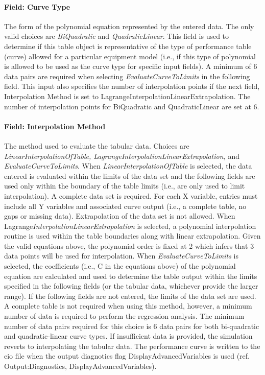 \paragraph{Field: Curve Type}\label{field-curve-type-1}

The form of the polynomial equation represented by the entered data. The only valid choices are \emph{BiQuadratic} and \emph{QuadraticLinear}. This field is used to determine if this table object is representative of the type of performance table (curve) allowed for a particular equipment model (i.e., if this type of polynomial is allowed to be used as the curve type for specific input fields). A minimum of 6 data pairs are required when selecting \emph{EvaluateCurveToLimits} in the following field. This input also specifies the number of interpolation points if the next field, Interpolation Method is set to LagrangeInterpolationLinearExtrapolation. The number of interpolation points for BiQuadratic and QuadraticLinear are set at 6.

\paragraph{Field: Interpolation Method}\label{field-interpolation-method-1}

The method used to evaluate the tabular data. Choices are \emph{LinearInterpolationOfTable, LagrangeInterpolationLinearExtrapolation,} and \emph{EvaluateCurveToLimits}. When \emph{LinearInterpolationOfTable} is selected, the data entered is evaluated within the limits of the data set and the following fields are used only within the boundary of the table limits (i.e., are only used to limit interpolation). A complete data set is required. For each X variable, entries must include all Y variables and associated curve output (i.e., a complete table, no gaps or missing data). Extrapolation of the data set is not allowed. When Lagrange\emph{InterpolationLinearExtrapolation} is selected, a polynomial interpolation routine is used within the table boundaries along with linear extrapolation. Given the valid equations above, the polynomial order is fixed at 2 which infers that 3 data points will be used for interpolation. When \emph{EvaluateCurveToLimits} is selected, the coefficients (i.e., C in the equations above) of the polynomial equation are calculated and used to determine the table output within the limits specified in the following fields (or the tabular data, whichever provide the larger range). If the following fields are not entered, the limits of the data set are used. A complete table is not required when using this method, however, a minimum number of data is required to perform the regression analysis. The minimum number of data pairs required for this choice is 6 data pairs for both bi-quadratic and quadratic-linear curve types. If insufficient data is provided, the simulation reverts to interpolating the tabular data. The performance curve is written to the eio file when the output diagnotics flag DisplayAdvancedVariables is used (ref. Output:Diagnostics, DisplayAdvancedVariables).


